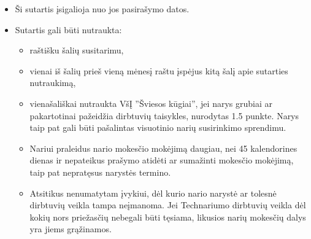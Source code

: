 \documentclass[paper=a4]{article}
\begin{document}
\begin{itemize}
\item Ši sutartis įsigalioja nuo jos pasirašymo datos.
\item Sutartis gali būti nutraukta:
\begin{itemize}
\item raštišku šalių susitarimu,
\item vienai iš šalių prieš vieną mėnesį raštu įspėjus kitą šalį apie sutarties nutraukimą,
\item vienašališkai nutraukta VšĮ ''Šviesos kūgiai'', jei narys grubiai ar pakartotinai pažeidžia dirbtuvių taisykles, nurodytas 1.5 punkte. Narys taip pat gali būti pašalintas visuotinio narių susirinkimo sprendimu.

\item Nariui praleidus nario mokesčio mokėjimą daugiau, nei 45 kalendorines dienas ir nepateikus prašymo atidėti ar sumažinti mokesčio mokėjimą, taip pat nepratęsus narystės termino.

\item Atsitikus nenumatytam įvykiui, dėl kurio nario narystė ar tolesnė dirbtuvių veikla tampa
neįmanoma. Jei Technariumo dirbtuvių veikla dėl kokių nors priežasčių nebegali būti tęsiama, likusios narių mokesčių dalys yra jiems grąžinamos.
\end{itemize}  

\end{itemize} 


%


\agreementParties{}


\end{document}
